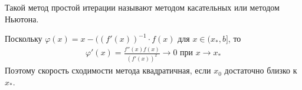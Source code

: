 \documentclass[__main__.tex]{subfiles}
\begin{document}
Такой метод простой итерации называют методом касательных или методом Ньютона.

Поскольку $\varphi(x)=x-((f'(x))^{-1}\cdot f(x)$ для $x \in (x_*, b]$, то 
\begin{gather*}
\varphi ' (x) = \frac{f''(x)f(x)}{(f'(x))^2} \longrightarrow 0 \mbox{ при } x \rightarrow x_*
\end{gather*}
Поэтому скорость сходимости метода квадратичная, если $x_0$ достаточно близко к $x_*$.
\end{document}
